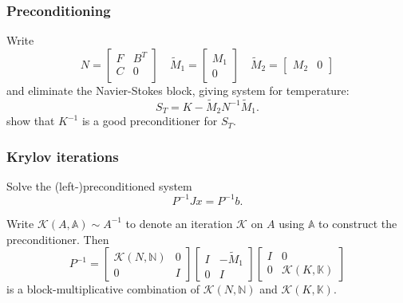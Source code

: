 \documentclass[presentation]{beamer}
\newcommand{\KSP}[2]{\ensuremath{\mathcal{K}\left(#1, \mathbb{#2}\right)}}
\newcommand{\ksp}[1]{\KSP{#1}{#1}}
\begin{document}
\begin{frame}
  \frametitle{Preconditioning \parencite{Howle:2012}}
  Write
  \begin{equation*}
    N = \begin{bmatrix}
      F & B^T\\
      C & 0 \\
    \end{bmatrix} \quad
    \tilde{M}_1 =
    \begin{bmatrix}
      M_1 \\
      0
    \end{bmatrix} \quad
    \tilde{M}_2 = \begin{bmatrix}
      M_2 & 0
    \end{bmatrix}
  \end{equation*}
  and eliminate the Navier-Stokes block, giving system for temperature:
  \begin{equation*}
    S_T = K - \tilde{M}_2 N^{-1} \tilde{M}_1.
  \end{equation*}
  \cite{Howle:2012} show that $K^{-1}$ is a good preconditioner for
  $S_T$.
\end{frame}
\begin{frame}
  \frametitle{Krylov iterations}
  Solve the (left-)preconditioned system
  \begin{equation*}
    P^{-1} J x = P^{-1} b.
  \end{equation*}

  Write $\mathcal{K}(A, \mathbb{A})\sim A^{-1}$ to denote an iteration
  $\mathcal{K}$ on $A$ using $\mathbb{A}$ to construct the
  preconditioner.  Then
  \begin{equation*}
    P^{-1} = \begin{bmatrix}
      \ksp{N} & 0 \\
      0 & I
    \end{bmatrix}
    \begin{bmatrix}
      I & -\tilde{M}_1 \\
      0 & I
    \end{bmatrix}
    \begin{bmatrix}
      I & 0\\
      0 & \ksp{K}
    \end{bmatrix}
  \end{equation*}
  is a block-multiplicative combination of $\ksp{N}$ and $\ksp{K}$.
\end{frame}
\end{document}
